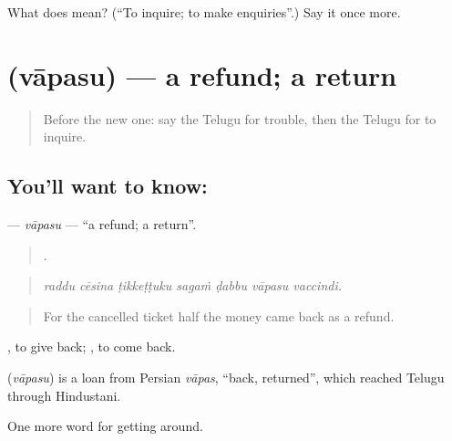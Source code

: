 \begin{tcolorbox}[breakable,colback=teal!4,colframe=teal!35!black,title={Before you move on}]
What does   mean? (\textquotedblleft{}To inquire; to make enquiries\textquotedblright{}.) Say it once more.
\end{tcolorbox}
\section[\texorpdfstring{\te{వాపసు} (vāpasu)}{వాపసు (vāpasu)}]{ (vāpasu) — a refund; a return}

\label{lesson:TE-C460-vapasu}



\begin{quote}
Before the new one: say the Telugu for trouble, then the Telugu for to inquire.
\end{quote}

\subsection*{You'll want to know: }
\textbf{} — \emph{vāpasu} — \textquotedblleft{}a refund; a return\textquotedblright{}.

\begin{quote}
      .
\end{quote}

\begin{quote}
\emph{raddu cēsina ṭikkeṭṭuku sagaṁ ḍabbu vāpasu vaccindi.}
\end{quote}

\begin{quote}
For the cancelled ticket half the money came back as a refund.
\end{quote}

 , to give back;  , to come back.

\begin{cousinweb}
\textbf{} (\emph{vāpasu}) is a loan from Persian \emph{vāpas}, \textquotedblleft{}back, returned\textquotedblright{}, which reached Telugu through Hindustani.
\end{cousinweb}

\begin{grammarlens}[title={What you've built}]
One more word for getting around.
\end{grammarlens}

